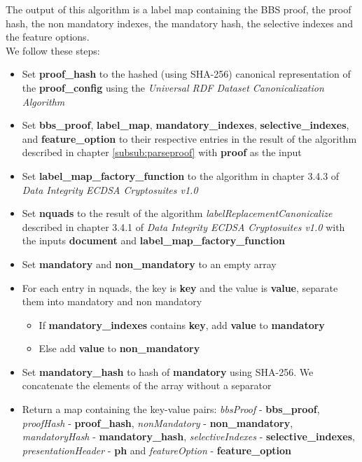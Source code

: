 \documentclass[
	a4paper               %
	,bibliography=totoc   %
	,listof=totoc         %
	,monolingual
]{bfhthesis}              %
\begin{document}
The output of this algorithm is a label map containing the BBS proof, the proof hash, the non mandatory indexes, the mandatory hash, the selective indexes and the feature options.\\

We follow these steps:
\begin{itemize}
	\item Set \textbf{proof\_hash} to the hashed (using SHA-256) canonical representation of the \textbf{proof\_config} using the \textit{Universal RDF Dataset Canonicalization Algorithm}\cite{rdf}
	\item Set \textbf{bbs\_proof}, \textbf{label\_map}, \textbf{mandatory\_indexes}, \textbf{selective\_indexes}, \textbf{} and \textbf{feature\_option} to their respective entries in the result of the algorithm described in chapter \ref{subsub:parseproof} with \textbf{proof} as the input
	\item Set \textbf{label\_map\_factory\_function} to the algorithm in chapter 3.4.3 of \textit{Data Integrity ECDSA Cryptosuites v1.0}\cite{ecdsa}
	\item Set \textbf{nquads} to the result of the algorithm \textit{labelReplacementCanonicalize} described in chapter 3.4.1 of \textit{Data Integrity ECDSA Cryptosuites v1.0}\cite{ecdsa} with the inputs \textbf{document} and \textbf{label\_map\_factory\_function}
	\item Set \textbf{mandatory} and \textbf{non\_mandatory} to an empty array
	\item For each entry in nquads, the key is \textbf{key} and the value is \textbf{value}, separate them into mandatory and non mandatory
	\begin{itemize}
		\item If \textbf{mandatory\_indexes} contains \textbf{key}, add \textbf{value} to \textbf{mandatory}
		\item Else add \textbf{value} to \textbf{non\_mandatory}
	\end{itemize}
	\item Set \textbf{mandatory\_hash} to hash of \textbf{mandatory} using SHA-256. We concatenate the elements of the array without a separator
	\item Return a map containing the key-value pairs: \textit{bbsProof} - \textbf{bbs\_proof}, \textit{proofHash} - \textbf{proof\_hash}, \textit{nonMandatory} - \textbf{non\_mandatory}, \textit{mandatoryHash} - \textbf{mandatory\_hash}, \textit{selectiveIndexes} - \textbf{selective\_indexes}, \textit{presentationHeader} - \textbf{ph} and \textit{featureOption} - \textbf{feature\_option}
\end{itemize}
\end{document}
